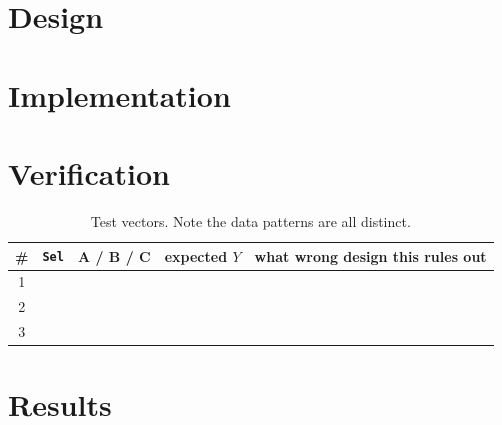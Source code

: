 
\section{Design}

\section{Implementation}



\section{Verification}

\begin{table}[htbp]
\centering
\caption{Test vectors. Note the data patterns are all distinct.}
\label{tab:lab03-vectors}
\begin{tabular}{cllll}
\toprule
\# & \texttt{Sel} & A / B / C & expected $Y$ & what wrong design this rules out \\
\midrule
1 & & & & \\
2 & & & & \\
3 & & & & \\
\bottomrule
\end{tabular}
\end{table}


\section{Results}

